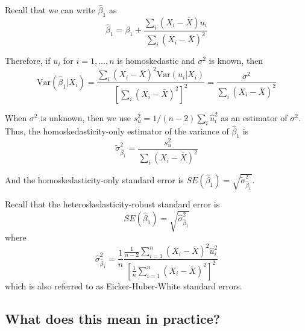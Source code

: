 \documentclass[a4paper,11pt]{article}
\newcommand{\var}{\mathrm{Var}}
\begin{document}
Recall that we can write \(\hat{\beta}_1\) as
\begin{equation*}
\hat{\beta}_1 = \beta_1 + \frac{\sum_i (X_i - \bar{X})u_i}{\sum_i
(X_i - \bar{X})^2} 
\end{equation*} 

Therefore, if \(u_i\) for \(i=1, \ldots, n\) is
homoskedastic and \(\sigma^2\) is known, then
\begin{equation}
\label{eq:vbeta-1a} \var(\hat{\beta}_1 | X_i) = \frac{\sum_i (X_i -
\bar{X})^2 \var(u_i|X_i)}{\left[\sum_i (X_i - \bar{X})^2\right]^2} =
\frac{\sigma^2}{\sum_i (X_i - \bar{X})^2} 
\end{equation} 

When \(\sigma^2\) is unknown, then we use \(s^2_u = 1/(n-2) \sum_i
\hat{u}_i^2\) as an estimator of \(\sigma^2\). Thus, the
homoskedasticity-only estimator of the variance of \(\hat{\beta}_1\) is
\begin{equation}
\label{eq:vbeta-1b} \tilde{\sigma}^2_{\hat{\beta}_1} =
\frac{s^2_u}{\sum_i (X_i - \bar{X})^2} 
\end{equation} 

And the homoskedasticity-only standard error is \(SE(\hat{\beta}_1) =
\sqrt{\tilde{\sigma}^2_{\hat{\beta}_1}}\).

Recall that the heteroskedasticity-robust standard error is
\begin{equation*}
SE(\hat{\beta}_1) = \sqrt{\hat{\sigma}^2_{\hat{\beta}_1}}
\end{equation*} 
where
\begin{equation*}
\hat{\sigma}^2_{\hat{\beta}_1} = \frac{1}{n} \frac{\frac{1}{n-2}
\sum_{i=1}^n (X_i - \bar{X})^2 \hat{u}^2_i}{\left[ \frac{1}{n}
\sum_{i=1}^n (X_i - \bar{X})^2 \right]^2} 
\end{equation*} 
which is also referred to as Eicker-Huber-White standard errors.


\subsection{What does this mean in practice?}
\label{sec:orgee5d9e8}
\end{document}
